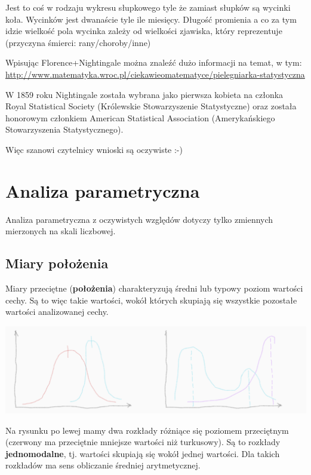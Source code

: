 \documentclass[
  openany]{book}
\begin{document}
Jest to coś w rodzaju wykresu słupkowego tyle że zamiast słupków są wycinki koła. Wycinków jest dwanaście tyle ile miesięcy.
Długość promienia a co za tym idzie wielkość pola wycinka zależy od wielkości zjawiska,
który reprezentuje (przyczyna śmierci: rany/choroby/inne)

Wpisując Florence+Nightingale można znaleźć dużo informacji
na temat, w tym: \url{http://www.matematyka.wroc.pl/ciekawieomatematyce/pielegniarka-statystyczna}

W 1859 roku Nightingale została wybrana jako pierwsza kobieta na członka Royal Statistical Society (Królewskie Stowarzyszenie Statystyczne) oraz została honorowym członkiem American Statistical Association (Amerykańskiego Stowarzyszenia Statystycznego).

Więc szanowi czytelnicy wnioski są oczywiste :-)

\hypertarget{analiza-parametryczna}{%
\section{Analiza parametryczna}\label{analiza-parametryczna}}

Analiza parametryczna z oczywistych względów dotyczy tylko zmiennych
mierzonych na skali liczbowej.

\hypertarget{miary-poux142oux17cenia}{%
\subsection{Miary położenia}\label{miary-poux142oux17cenia}}

Miary przeciętne (\textbf{położenia}) charakteryzują średni lub
typowy poziom wartości cechy. Są to więc takie wartości, wokół których
skupiają się wszystkie pozostałe wartości analizowanej cechy.

\includegraphics{./canvas_distr_11.png}

Na rysunku po lewej mamy dwa rozkłady różniące się poziomem przeciętnym (czerwony ma przeciętnie mniejsze wartości
niż turkusowy). Są to rozkłady \textbf{jednomodalne}, tj. wartości skupiają się wokół jednej wartości.
Dla takich rozkładów ma sens obliczanie średniej arytmetycznej.
\end{document}
